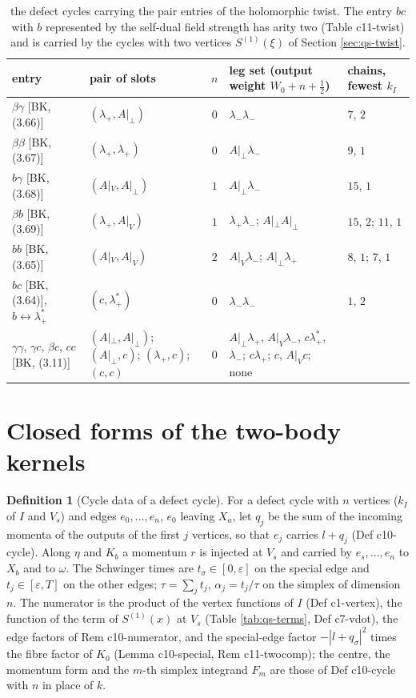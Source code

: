 \documentclass[11pt]{article}
\numberwithin{equation}{section}
\theoremstyle{plain}
\theoremstyle{definition}
\newtheorem{definition}[theorem]{Definition}
\newcommand{\Ap}{A|_{\perp}}
\newcommand{\AV}{A|_V}
\begin{document}
\begin{longtable}{p{3.2cm}|p{3.4cm}|c|p{4.6cm}|p{2.0cm}}
\caption{the defect cycles carrying the pair entries of the holomorphic twist. The entry $bc$ with $b$ represented by the self-dual field strength has arity two (Table c11-twist) and is carried by the cycles with two vertices $S^{(1)}(\xi)$ of Section \ref{sec:qs-twist}.}\label{tab:qs-twistcensus}\\
entry & pair of slots & $n$ & leg set (output weight $W_0+n+\tfrac12$) & chains, fewest $k_I$\\
\hline
$\beta\gamma$ [BK, (3.66)] & $(\lambda_+,\Ap)$ & $0$ & $\lambda_-\lambda_-$ & $7$, $2$\\
$\beta\beta$ [BK, (3.67)] & $(\lambda_+,\lambda_+)$ & $0$ & $\Ap\lambda_-$ & $9$, $1$\\
$b\gamma$ [BK, (3.68)] & $(\AV,\Ap)$ & $1$ & $\Ap\lambda_-$ & $15$, $1$\\
$\beta b$ [BK, (3.69)] & $(\lambda_+,\AV)$ & $1$ & $\lambda_+\lambda_-$; $\Ap\Ap$ & $15$, $2$; $11$, $1$\\
$bb$ [BK, (3.65)] & $(\AV,\AV)$ & $2$ & $\AV\lambda_-$; $\Ap\lambda_+$ & $8$, $1$; $7$, $1$\\
$bc$ [BK, (3.64)], $b\leftrightarrow\lambda^*_+$ & $(c,\lambda^*_+)$ & $0$ & $\lambda_-\lambda_-$ & $1$, $2$\\
$\gamma\gamma$, $\gamma c$, $\beta c$, $cc$ [BK, (3.11)] & $(\Ap,\Ap)$; $(\Ap,c)$; $(\lambda_+,c)$; $(c,c)$ & $0$ & $\Ap\lambda_+$, $\AV\lambda_-$, $c\lambda^*_+$, $\lambda_-$; $c\lambda_+$; $c$, $\AV c$; none & \\
\end{longtable}


\section{Closed forms of the two-body kernels}
\label{sec:qs-closed}

\begin{definition}[Cycle data of a defect cycle]
\label{def:qs-cycle}
For a defect cycle with $n$ vertices ($k_I$ of $I$ and $V_s$) and edges $e_0,\dots,e_n$, $e_0$ leaving $X_a$, let $q_j$ be the sum of the incoming momenta of the outputs of the first $j$ vertices, so that $e_j$ carries $l+q_j$ (Def c10-cycle). Along $\eta$ and $K_b$ a momentum $r$ is injected at $V_s$ and carried by $e_s,\dots,e_n$ to $X_b$ and to $\omega$. The Schwinger times are $t_\sigma\in[0,\varepsilon]$ on the special edge and $t_j\in[\varepsilon,T]$ on the other edges; $\tau=\sum_jt_j$, $\alpha_j=t_j/\tau$ on the simplex of dimension $n$. The numerator is the product of the vertex functions of $I$ (Def c1-vertex), the function of the term of $S^{(1)}(x)$ at $V_s$ (Table \ref{tab:qs-terms}, Def c7-vdot), the edge factors of Rem c10-numerator, and the special-edge factor $-|l+q_\sigma|^2$ times the fibre factor of $K_0$ (Lemma c10-special, Rem c11-twocomp); the centre, the momentum form and the $m$-th simplex integrand $F_m$ are those of Def c10-cycle with $n$ in place of $k$.
\end{definition}
\end{document}
